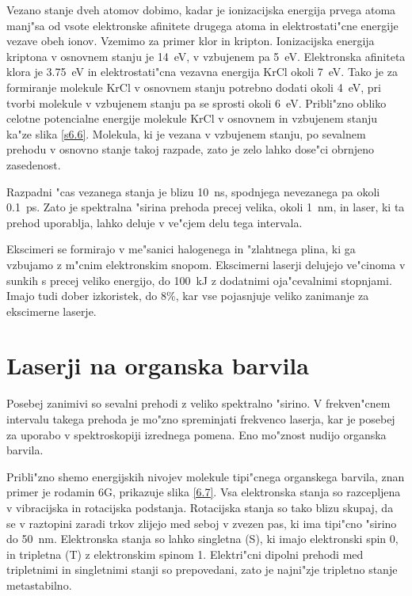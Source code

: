 Vezano stanje dveh atomov dobimo, kadar je ionizacijska energija prvega
atoma manj"sa od vsote elektronske afinitete drugega atoma in
elektrostati"cne energije vezave obeh ionov. Vzemimo za primer klor in
kripton. Ionizacijska energija kriptona v osnovnem stanju je 14~eV, v
vzbujenem pa 5~eV. Elektronska afiniteta klora je 3.75~eV in
elektrostati"cna vezavna energija KrCl okoli 7~eV. Tako je za formiranje
molekule KrCl v osnovnem stanju potrebno dodati okoli 4~eV, pri tvorbi
molekule v vzbujenem stanju pa se sprosti okoli 6~eV. Pribli"zno obliko
celotne potencialne energije molekule KrCl v osnovnem in vzbujenem stanju
ka"ze slika \ref{s6.6}. Molekula, ki je vezana v vzbujenem stanju, po
sevalnem prehodu v osnovno stanje takoj razpade, zato je zelo lahko dose"ci
obrnjeno zasedenost.

Razpadni "cas vezanega stanja je blizu 10~ns, spodnjega nevezanega pa okoli
0.1~ps. Zato je spektralna "sirina prehoda precej velika, okoli 1~nm, in
laser, ki ta prehod uporablja, lahko deluje v ve"cjem delu tega intervala.

Ekscimeri se formirajo v me"sanici halogenega in "zlahtnega plina, ki ga
vzbujamo z m"cnim elektronskim snopom. Ekscimerni laserji delujejo
ve"cinoma v sunkih s precej veliko energijo, do 100~kJ z dodatnimi
oja"cevalnimi stopnjami. Imajo tudi dober izkoristek, do 8\%, kar vse
pojasnjuje veliko zanimanje za ekscimerne laserje.

\section{Laserji na organska barvila}

Posebej zanimivi so sevalni prehodi z veliko spektralno "sirino. V
frekven"cnem intervalu takega prehoda je mo"zno spreminjati frekvenco
laserja, kar je posebej za uporabo v spektroskopiji izrednega pomena. Eno
mo"znost nudijo organska barvila.

Pribli"zno shemo energijskih nivojev molekule tipi"cnega organskega barvila,
znan primer je rodamin 6G, prikazuje slika \ref{6.7}. Vsa elektronska stanja
so razcepljena v vibracijska in rotacijska podstanja. Rotacijska stanja so
tako blizu skupaj, da se v raztopini zaradi trkov zlijejo med seboj v zvezen
pas, ki ima tipi"cno "sirino do 50~nm. Elektronska stanja so lahko singletna
(S), ki imajo elektronski spin 0, in tripletna (T) z elektronskim spinom 1.
Elektri"cni dipolni prehodi med tripletnimi in singletnimi stanji so
prepovedani, zato je najni"zje tripletno stanje metastabilno.

